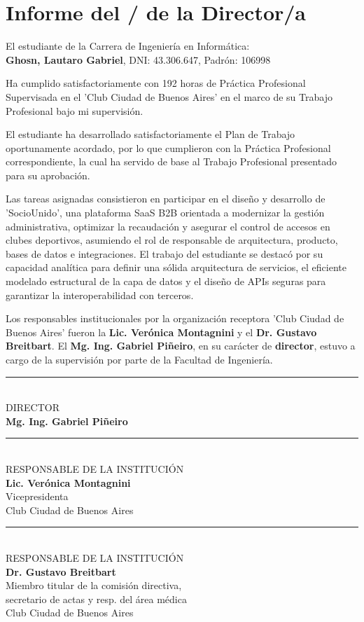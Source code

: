 \section{Informe del / de la Director/a}

El estudiante de la Carrera de Ingeniería en Informática: \\ 
\textbf{Ghosn, Lautaro Gabriel}, DNI: 43.306.647, Padrón: 106998

Ha cumplido satisfactoriamente con 192 horas de Práctica Profesional Supervisada en el 'Club Ciudad de Buenos Aires' en el marco de su Trabajo Profesional bajo mi supervisión.

El estudiante ha desarrollado satisfactoriamente el Plan de Trabajo oportunamente acordado, por lo que cumplieron con la Práctica Profesional correspondiente, la cual ha servido de base al Trabajo Profesional presentado para su aprobación.

Las tareas asignadas consistieron en participar en el diseño y desarrollo de 'SocioUnido', una plataforma SaaS B2B orientada a modernizar la gestión administrativa, optimizar la recaudación y asegurar el control de accesos en clubes deportivos, asumiendo el rol de responsable de arquitectura, producto, bases de datos e integraciones. El trabajo del estudiante se destacó por su capacidad analítica para definir una sólida arquitectura de servicios, el eficiente modelado estructural de la capa de datos y el diseño de APIs seguras para garantizar la interoperabilidad con terceros.

Los responsables institucionales por la organización receptora 'Club Ciudad de Buenos Aires' fueron la \textbf{Lic. Verónica Montagnini} y el \textbf{Dr. Gustavo Breitbart}. El \textbf{Mg. Ing. Gabriel Piñeiro}, en su carácter de \textbf{director}, estuvo a cargo de la supervisión por parte de la Facultad de Ingeniería.

\vspace{1.5cm}
\noindent\rule{8cm}{0.4pt} \\
DIRECTOR \\
\textbf{Mg. Ing. Gabriel Piñeiro}

\vspace{1.5cm}
\noindent
\begin{minipage}[t]{0.45\textwidth}
    \centering
    \rule{\linewidth}{0.4pt} \\
    RESPONSABLE DE LA INSTITUCIÓN \\
    \textbf{Lic. Verónica Montagnini} \\
    Vicepresidenta \\
    Club Ciudad de Buenos Aires
\end{minipage}
\hfill
\begin{minipage}[t]{0.45\textwidth}
    \centering
    \rule{\linewidth}{0.4pt} \\
    RESPONSABLE DE LA INSTITUCIÓN \\
    \textbf{Dr. Gustavo Breitbart} \\
    Miembro titular de la comisión directiva, \\
    secretario de actas y resp. del área médica \\
    Club Ciudad de Buenos Aires
\end{minipage}

